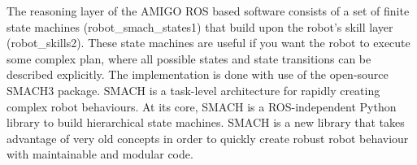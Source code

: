 The reasoning layer of the AMIGO ROS based software consists of a set of finite state machines (robot\_smach\_states1) that build upon the robot’s skill layer (robot\_skills2). These state machines are useful if you want the robot to execute some complex plan, where all possible states and state transitions can be described explicitly. 
The implementation is done with use of the open-source SMACH3 package. SMACH is a task-level architecture for rapidly creating complex robot behaviours. At its core, SMACH is a ROS-independent Python library to build hierarchical state machines. SMACH is a new library that takes advantage of very old concepts in order to quickly create robust robot behaviour with maintainable and modular code.